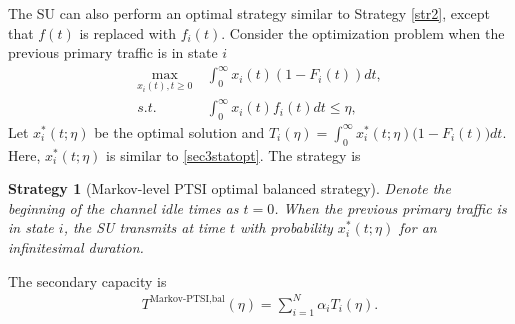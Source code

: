 \documentclass[10pt,final,journal,letterpaper]{IEEEtran}
\newtheorem{strategy}{Strategy}
\begin{document}
\par
The SU can also perform an optimal strategy similar to Strategy \ref{str2}, except that $f(t)$ is replaced with $f_i(t)$. Consider the optimization problem when the previous primary traffic is in state $i$
\begin{align}
    \max\limits_{x_i(t),t\geq 0}&\ \int_0^{\infty}x_i(t)(1-F_i(t))dt,\nonumber\\
    s.t.&\ \int_0^{\infty}x_i(t)f_i(t)dt\leq\eta,\nonumber
\end{align}
Let $x_i^{\ast}(t; \eta)$ be the optimal solution and $T_i(\eta)=\int_0^{\infty}x_i^{\ast}(t; \eta)\big(1-F_i(t)\big)dt$. Here, $x_i^{\ast}(t; \eta)$ is similar to \eqref{sec3statopt}. The strategy is
\begin{strategy}[Markov-level PTSI optimal balanced strategy]
Denote the beginning of the channel idle times as $t=0$. When the previous primary traffic is in state $i$, the SU transmits at time $t$ with probability $x_i^{\ast}(t; \eta)$ for an infinitesimal duration.
\end{strategy}
The secondary capacity is
\begin{align}\label{sec3eq7}
    T^{\text{Markov-PTSI,bal}}(\eta)=\sum_{i=1}^{N}\alpha_iT_i(\eta).
\end{align}
\end{document}
